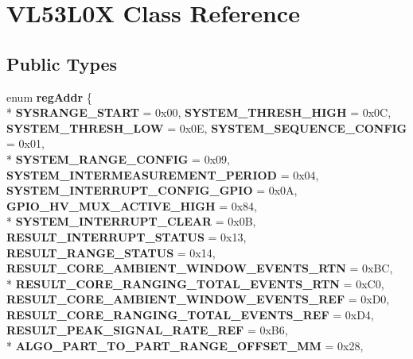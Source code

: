 \hypertarget{class_v_l53_l0_x}{}\section{V\+L53\+L0X Class Reference}
\label{class_v_l53_l0_x}
\subsection*{Public Types}
\begin{DoxyCompactItemize}
\item 
enum {\bfseries reg\+Addr} \{ \\*
{\bfseries S\+Y\+S\+R\+A\+N\+G\+E\+\_\+\+S\+T\+A\+RT} = 0x00, 
{\bfseries S\+Y\+S\+T\+E\+M\+\_\+\+T\+H\+R\+E\+S\+H\+\_\+\+H\+I\+GH} = 0x0C, 
{\bfseries S\+Y\+S\+T\+E\+M\+\_\+\+T\+H\+R\+E\+S\+H\+\_\+\+L\+OW} = 0x0E, 
{\bfseries S\+Y\+S\+T\+E\+M\+\_\+\+S\+E\+Q\+U\+E\+N\+C\+E\+\_\+\+C\+O\+N\+F\+IG} = 0x01, 
\\*
{\bfseries S\+Y\+S\+T\+E\+M\+\_\+\+R\+A\+N\+G\+E\+\_\+\+C\+O\+N\+F\+IG} = 0x09, 
{\bfseries S\+Y\+S\+T\+E\+M\+\_\+\+I\+N\+T\+E\+R\+M\+E\+A\+S\+U\+R\+E\+M\+E\+N\+T\+\_\+\+P\+E\+R\+I\+OD} = 0x04, 
{\bfseries S\+Y\+S\+T\+E\+M\+\_\+\+I\+N\+T\+E\+R\+R\+U\+P\+T\+\_\+\+C\+O\+N\+F\+I\+G\+\_\+\+G\+P\+IO} = 0x0A, 
{\bfseries G\+P\+I\+O\+\_\+\+H\+V\+\_\+\+M\+U\+X\+\_\+\+A\+C\+T\+I\+V\+E\+\_\+\+H\+I\+GH} = 0x84, 
\\*
{\bfseries S\+Y\+S\+T\+E\+M\+\_\+\+I\+N\+T\+E\+R\+R\+U\+P\+T\+\_\+\+C\+L\+E\+AR} = 0x0B, 
{\bfseries R\+E\+S\+U\+L\+T\+\_\+\+I\+N\+T\+E\+R\+R\+U\+P\+T\+\_\+\+S\+T\+A\+T\+US} = 0x13, 
{\bfseries R\+E\+S\+U\+L\+T\+\_\+\+R\+A\+N\+G\+E\+\_\+\+S\+T\+A\+T\+US} = 0x14, 
{\bfseries R\+E\+S\+U\+L\+T\+\_\+\+C\+O\+R\+E\+\_\+\+A\+M\+B\+I\+E\+N\+T\+\_\+\+W\+I\+N\+D\+O\+W\+\_\+\+E\+V\+E\+N\+T\+S\+\_\+\+R\+TN} = 0x\+BC, 
\\*
{\bfseries R\+E\+S\+U\+L\+T\+\_\+\+C\+O\+R\+E\+\_\+\+R\+A\+N\+G\+I\+N\+G\+\_\+\+T\+O\+T\+A\+L\+\_\+\+E\+V\+E\+N\+T\+S\+\_\+\+R\+TN} = 0x\+C0, 
{\bfseries R\+E\+S\+U\+L\+T\+\_\+\+C\+O\+R\+E\+\_\+\+A\+M\+B\+I\+E\+N\+T\+\_\+\+W\+I\+N\+D\+O\+W\+\_\+\+E\+V\+E\+N\+T\+S\+\_\+\+R\+EF} = 0x\+D0, 
{\bfseries R\+E\+S\+U\+L\+T\+\_\+\+C\+O\+R\+E\+\_\+\+R\+A\+N\+G\+I\+N\+G\+\_\+\+T\+O\+T\+A\+L\+\_\+\+E\+V\+E\+N\+T\+S\+\_\+\+R\+EF} = 0x\+D4, 
{\bfseries R\+E\+S\+U\+L\+T\+\_\+\+P\+E\+A\+K\+\_\+\+S\+I\+G\+N\+A\+L\+\_\+\+R\+A\+T\+E\+\_\+\+R\+EF} = 0x\+B6, 
\\*
{\bfseries A\+L\+G\+O\+\_\+\+P\+A\+R\+T\+\_\+\+T\+O\+\_\+\+P\+A\+R\+T\+\_\+\+R\+A\+N\+G\+E\+\_\+\+O\+F\+F\+S\+E\+T\+\_\+\+MM} = 0x28, 

\end{DoxyCompactItemize}
